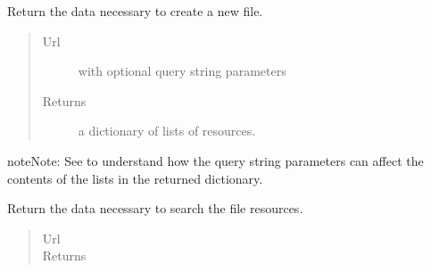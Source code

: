 \documentclass[letterpaper,10pt,english]{sphinxmanual}
\begin{document}
\begin{fulllineitems}
\begin{fulllineitems}
\end{fulllineitems}


\begin{fulllineitems}
\label{api:onlinelinguisticdatabase.controllers.files.FilesController.new}
Return the data necessary to create a new file.
\begin{quote}\begin{description}
\item[{Url }] \leavevmode
{} with optional query string parameters

\item[{Returns}] \leavevmode
a dictionary of lists of resources.

\end{description}\end{quote}

\begin{notice}{note}{Note:}
See  to understand how the query string
parameters can affect the contents of the lists in the returned
dictionary.
\end{notice}

\end{fulllineitems}


\begin{fulllineitems}
\label{api:onlinelinguisticdatabase.controllers.files.FilesController.new_search}
Return the data necessary to search the file resources.
\begin{quote}\begin{description}
\item[{Url }] \leavevmode
{}

\item[{Returns}] \leavevmode
{}

\end{description}\end{quote}

\end{fulllineitems}



\end{fulllineitems}
\end{document}
